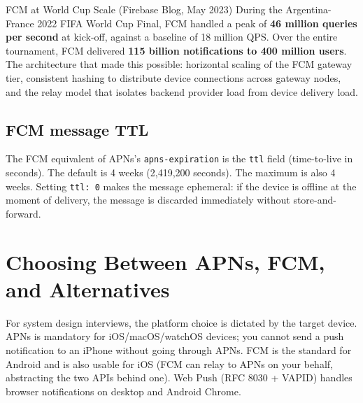\documentclass[11pt,a4paper]{article}
\begin{document}
\begin{industrybox}{FCM at World Cup Scale (Firebase Blog, May 2023)}
During the Argentina-France 2022 FIFA World Cup Final, FCM handled a peak of \textbf{46 million queries per second} at kick-off, against a baseline of 18 million QPS. Over the entire tournament, FCM delivered \textbf{115 billion notifications to 400 million users}. The architecture that made this possible: horizontal scaling of the FCM gateway tier, consistent hashing to distribute device connections across gateway nodes, and the relay model that isolates backend provider load from device delivery load.
\end{industrybox}

\subsection{FCM message TTL}

The FCM equivalent of APNs's \texttt{apns-expiration} is the \texttt{ttl} field (time-to-live in seconds). The default is 4 weeks (2,419,200 seconds). The maximum is also 4 weeks. Setting \texttt{ttl: 0} makes the message ephemeral: if the device is offline at the moment of delivery, the message is discarded immediately without store-and-forward.

\section{Choosing Between APNs, FCM, and Alternatives}

For system design interviews, the platform choice is dictated by the target device. APNs is mandatory for iOS/macOS/watchOS devices; you cannot send a push notification to an iPhone without going through APNs. FCM is the standard for Android and is also usable for iOS (FCM can relay to APNs on your behalf, abstracting the two APIs behind one). Web Push (RFC 8030 + VAPID) handles browser notifications on desktop and Android Chrome.
\end{document}
